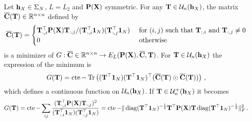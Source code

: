 

\begin{lemma}
	\label{lemma:minimizers}
	Let ${\mathbf{h}}_X \in \Sigma_N$, $L=L_2$ and ${\mathbf{P}}({\mathbf{X}})$ symmetric. For any ${\mathbf{T}} \in {\mathcal{U}}_n({\mathbf{h}}_X)$, the matrix $\overline{{\mathbf{C}}}({\mathbf{T}}) \in \mathbb{R}^{n \times n}$ defined by
	\begin{equation}
		\overline{{\mathbf{C}}}({\mathbf{T}}) = \begin{cases} {\mathbf{T}}_{:,i}^\top {\mathbf{P}}({\mathbf{X}}) {\mathbf{T}}_{:,j} / ({\mathbf{T}}_{:,i}^\top \bm{1}_N)({\mathbf{T}}_{:,j}^\top \bm{1}_N)& \text{ for } (i,j) \text{ such that } {\mathbf{T}}_{:,i} \text{ and } {\mathbf{T}}_{:,j} \neq 0 \\ 0 & \text{ otherwise} \end{cases}
	\end{equation}
	is a minimizer of $G: \overline{{\mathbf{C}}} \in \mathbb{R}^{n \times n} \to E_L({\mathbf{P}}({\mathbf{X}}), \overline{{\mathbf{C}}}, {\mathbf{T}})$. For ${\mathbf{T}} \in {\mathcal{U}}_n({\mathbf{h}}_X)$ the expression of the minimum is
	\begin{equation}
		G({\mathbf{T}}) = \operatorname{cte} - \operatorname{Tr}\left(({\mathbf{T}}^\top \bm{1}_N) ({\mathbf{T}}^\top \bm{1}_N)^\top(\overline{{\mathbf{C}}}({\mathbf{T}}) \odot \overline{{\mathbf{C}}}({\mathbf{T}}))\right)\,,
	\end{equation}
	which defines a continuous function on ${\mathcal{U}}_{n}({\mathbf{h}}_X)$. If ${\mathbf{T}} \in {\mathcal{U}}_{n}^{+}({\mathbf{h}}_X)$ it becomes
	\begin{equation}
		G({\mathbf{T}}) = \operatorname{cte} - \sum_{ij} \frac{({\mathbf{T}}_{:,i}^\top {\mathbf{P}}({\mathbf{X}}) {\mathbf{T}}_{:,j})^{2}}{({\mathbf{T}}_{:,i}^\top \bm{1}_N)({\mathbf{T}}_{:,j}^\top\bm{1}_N)} = \operatorname{cte} - \|\operatorname{diag}({\mathbf{T}}^\top \bm{1}_N)^{-\frac{1}{2}} {\mathbf{T}}^\top {\mathbf{P}}({\mathbf{X}}) {\mathbf{T}}\operatorname{diag}({\mathbf{T}}^\top \bm{1}_N)^{-\frac{1}{2}}\|_F^2\,.
	\end{equation}
\end{lemma}

